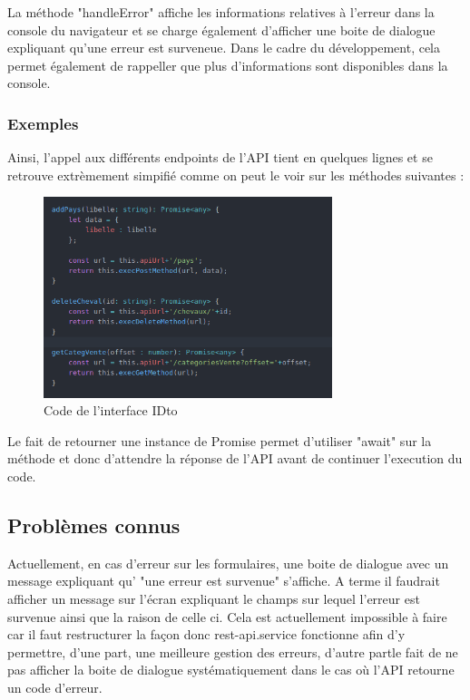 				La méthode "handleError" affiche les informations relatives à l'erreur dans la console du navigateur et se charge également d'afficher une boite de dialogue expliquant qu'une erreur est surveneue. Dans le cadre du développement, cela permet également de rappeller que plus d'informations sont disponibles dans la console.

			\subsubsection{Exemples}

			Ainsi, l'appel aux différents endpoints de l'API tient en quelques lignes et se retrouve extrèmement simpifié comme on peut le voir sur les méthodes suivantes :

				\begin{figure}[H]
					\centering\includegraphics[width=0.75\textwidth, keepaspectratio]{res/ionic-rest-add-delete-get.png}
					\caption{Code de l'interface IDto}
				\end{figure}

			Le fait de retourner une instance de Promise permet d'utiliser "await" sur la méthode et donc d'attendre la réponse de l'API avant de continuer l'execution du code.

		\subsection{Problèmes connus}


			Actuellement, en cas d'erreur sur les formulaires, une boite de dialogue avec un message expliquant qu' "une erreur est survenue" s'affiche. A terme il faudrait afficher un message sur l'écran expliquant le champs sur lequel l'erreur est survenue ainsi que la raison de celle ci. Cela est actuellement impossible à faire car il faut restructurer la façon donc rest-api.service fonctionne afin d'y permettre, d'une part, une meilleure gestion des erreurs, d'autre partle fait de ne pas afficher la boite de dialogue systématiquement dans le cas où l'API retourne un code d'erreur.
